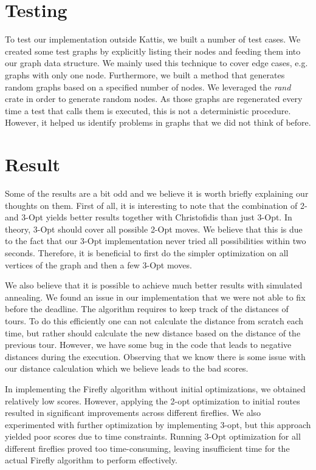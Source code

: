 \documentclass{article}
\begin{document}
\section{Testing}
To test our implementation outside Kattis, we built a number of test cases. We created some test graphs by explicitly listing their nodes and feeding them into our graph data structure. We mainly used this technique to cover edge cases, e.g. graphs with only one node. Furthermore, we built a method that generates random graphs based on a specified number of nodes. We leveraged the \textit{rand} crate in order to generate random nodes. As those graphs are regenerated every time a test that calls them is executed, this is not a deterministic procedure. However, it helped us identify problems in graphs that we did not think of before. 

\section{Result}
Some of the results are a bit odd and we believe it is worth briefly explaining our thoughts on them. First of all, it is interesting to note that the combination of 2- and 3-Opt yields better results together with Christofidis than just 3-Opt. In theory, 3-Opt should cover all possible 2-Opt moves. We believe that this is due to the fact that our 3-Opt implementation never tried all possibilities within two seconds. Therefore, it is beneficial to first do the simpler optimization on all vertices of the graph and then a few 3-Opt moves.

We also believe that it is possible to achieve much better results with simulated annealing. We found an issue in our implementation that we were not able to fix before the deadline. The algorithm requires to keep track of the distances of tours. To do this efficiently one can not calculate the distance from scratch each time, but rather should calculate the new distance based on the distance of the previous tour. However, we have some bug in the code that leads to negative distances during the execution. Observing that we know there is some issue with our distance calculation which we believe leads to the bad scores.

In implementing the Firefly algorithm without initial optimizations, we obtained relatively low scores. However, applying the 2-opt optimization to initial routes resulted in significant improvements across different fireflies. We also experimented with further optimization by implementing 3-opt, but this approach yielded poor scores due to time constraints. Running 3-Opt optimization for all different fireflies proved too time-consuming, leaving insufficient time for the actual Firefly algorithm to perform effectively.
\end{document}
